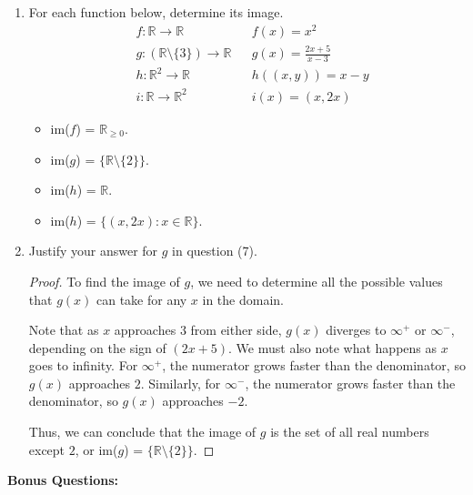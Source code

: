 \documentclass{article}
\begin{document}
\begin{enumerate}
	\item For each function below, determine its image.
		\begin{align*}
			& f : \mathbb{R} \rightarrow \mathbb{R} & & f(x) = x^2 \\
			& g : (\mathbb{R} \setminus \{ 3 \}) \rightarrow \mathbb{R} & & g(x) = \frac{2x + 5}{x - 3} \\
			& h : \mathbb{R}^2 \rightarrow \mathbb{R} & & h((x,y)) = x - y \\
			& i : \mathbb{R} \rightarrow \mathbb{R}^2 & & i(x) = (x, 2x) 
		\end{align*}
             \begin{itemize}
                \item im($f$) = $\mathbb{R}_{\ge 0}$.
                \item im($g$) = $\{ \mathbb{R} \setminus \{ 2 \} \}$.
                \item im($h$) = $\mathbb{R}$.
                \item im($h$) = $\{ (x, 2x) : x \in\mathbb{R} \}$.
            \end{itemize}

	\item Justify your answer for $g$ in question (7).
            \begin{proof}
                To find the image of $g$, we need to determine all the possible values that $g(x)$ can take for any $x$ in the domain.
                
                \ppar Note that as $x$ approaches $3$ from either side, $g(x)$ diverges to $\infty^+$ or $\infty^\minus$, depending on the sign of $(2x + 5)$. We must also note what happens as $x$ goes to infinity. For $\infty^+$, the numerator grows faster than the denominator, so $g(x)$ approaches $2$. Similarly, for $\infty^\minus$, the numerator grows faster than the denominator, so $g(x)$ approaches $\minus2$.
                
                \ppar Thus, we can conclude that the image of $g$ is the set of all real numbers except $2$, or im($g$) = $\{ \mathbb{R} \setminus \{ 2 \} \}$.
            \end{proof}
 
    \end{enumerate}

    \newpage
    \textbf{Bonus Questions:}
    
\end{document}
